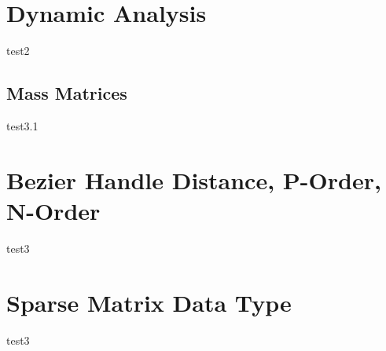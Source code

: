 \section{Dynamic Analysis}
\label{sec:dynAna}

test2

\subsection{Mass Matrices}
\label{sec:section3.1}

test3.1

\section{Bezier Handle Distance, P-Order, N-Order}
\label{sec:section3.2}

test3

\section{Sparse Matrix Data Type}
\label{sec:section3.3}

test3
